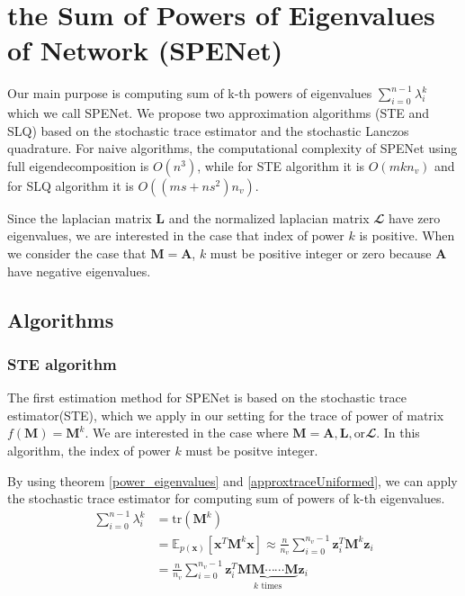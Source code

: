 \documentclass[senior,final,11pt]{iscs-thesis}
\begin{document}
\chapter{the Sum of Powers of Eigenvalues of Network (SPENet)}
Our main purpose is computing sum of k-th powers of eigenvalues $\sum_{i=0}^{n-1} \lambda_i^k$ which we call SPENet. We propose two approximation algorithms (STE and SLQ) based on the stochastic trace estimator and the stochastic Lanczos quadrature. For naive algorithms, the computational complexity of SPENet using full eigendecomposition is $O(n^3)$, while for STE algorithm it is $O(m k n_v)$ and for SLQ algorithm it is $O((ms + ns^2) n_v)$.

Since the laplacian matrix ${\mathbf L}$ and the normalized laplacian matrix ${\mathbfcal L}$ have zero eigenvalues, we are interested in the case that index of power $k$ is positive. When we consider the case that ${\mathbf M} = {\mathbf A}$, $k$ must be positive integer or zero because ${\mathbf A}$ have negative eigenvalues.


\section{Algorithms}
\subsection{STE algorithm}
The first estimation method for SPENet is based on the stochastic trace estimator(STE), which we apply in our setting for the trace of power of matrix $f({\mathbf M})={\mathbf M}^k$. We are interested in the case where ${\mathbf M} = {\mathbf A}, {\mathbf L}, \text{or} {\mathbfcal L}$. In this algorithm, the index of power $k$ must be positve integer.

By using theorem \ref{power_eigenvalues} and \ref{approxtraceUniformed}, we can apply the stochastic trace estimator for computing sum of powers of k-th eigenvalues.
\begin{align}
    \sum_{i=0}^{n-1} \lambda_i^k &= \mathrm{tr}({\mathbf M}^k)  \nonumber\\
    &= \mathbb{E}_{p(\mathbf{x})}[\mathbf{x}^{T}{\mathbf M}^k \mathbf{x}] \approx \frac{n}{n_v}\sum_{i=0}^{n_v-1} \mathbf{z}_i^{T}{\mathbf M}^k\mathbf{z}_i \\
    &= \frac{n}{n_v}\sum_{i=0}^{n_v-1} \mathbf{z}_i^{T} \underbrace{{\mathbf M}{\mathbf M} \cdots \cdots {\mathbf M}}_{k \text{ times}} \mathbf{z}_i
\end{align}
\end{document}
